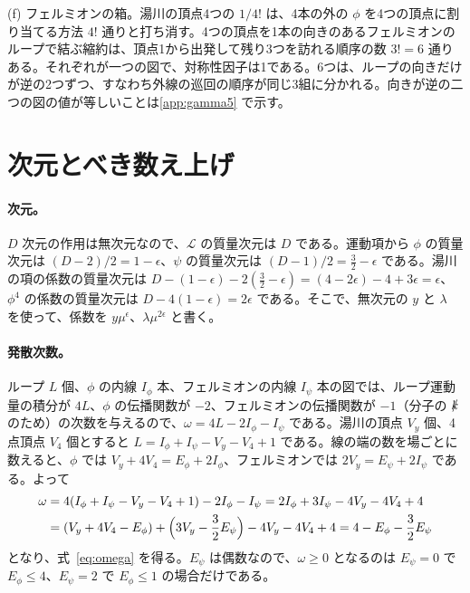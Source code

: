 \documentclass[a4paper,10pt]{ltjsarticle}
\begin{document}
(f) フェルミオンの箱。湯川の頂点4つの $1/4!$ は、4本の外の $\phi$ を4つの頂点に割り当てる方法 $4!$ 通りと打ち消す。4つの頂点を1本の向きのあるフェルミオンのループで結ぶ縮約は、頂点1から出発して残り3つを訪れる順序の数 $3!=6$ 通りある。それぞれが一つの図で、対称性因子は1である。6つは、ループの向きだけが逆の2つずつ、すなわち外線の巡回の順序が同じ3組に分かれる。向きが逆の二つの図の値が等しいことは\ref{app:gamma5} で示す。

\section{次元とべき数え上げ}\label{app:counting}

\paragraph{次元。}$D$ 次元の作用は無次元なので、$\mathcal{L}$ の質量次元は $D$ である。運動項から $\phi$ の質量次元は $(D-2)/2=1-\epsilon$、$\psi$ の質量次元は $(D-1)/2=\frac32-\epsilon$ である。湯川の項の係数の質量次元は $D-(1-\epsilon)-2(\frac32-\epsilon)=(4-2\epsilon)-4+3\epsilon=\epsilon$、$\phi^4$ の係数の質量次元は $D-4(1-\epsilon)=2\epsilon$ である。そこで、無次元の $y$ と $\lambda$ を使って、係数を $y\mu^\epsilon$、$\lambda\mu^{2\epsilon}$ と書く。

\paragraph{発散次数。}ループ $L$ 個、$\phi$ の内線 $I_\phi$ 本、フェルミオンの内線 $I_\psi$ 本の図では、ループ運動量の積分が $4L$、$\phi$ の伝播関数が $-2$、フェルミオンの伝播関数が $-1$（分子の $\slashed k$ のため）の次数を与えるので、$\omega=4L-2I_\phi-I_\psi$ である。湯川の頂点 $V_y$ 個、4点頂点 $V_4$ 個とすると $L=I_\phi+I_\psi-V_y-V_4+1$ である。線の端の数を場ごとに数えると、$\phi$ では $V_y+4V_4=E_\phi+2I_\phi$、フェルミオンでは $2V_y=E_\psi+2I_\psi$ である。よって
\begin{equation*}
\begin{aligned}
\omega&=4(I_\phi+I_\psi-V_y-V_4+1)-2I_\phi-I_\psi=2I_\phi+3I_\psi-4V_y-4V_4+4\\
&=(V_y+4V_4-E_\phi)+\Bigl(3V_y-\frac32E_\psi\Bigr)-4V_y-4V_4+4=4-E_\phi-\frac32E_\psi
\end{aligned}
\end{equation*}
となり、式~\eqref{eq:omega} を得る。$E_\psi$ は偶数なので、$\omega\ge0$ となるのは $E_\psi=0$ で $E_\phi\le4$、$E_\psi=2$ で $E_\phi\le1$ の場合だけである。
\end{document}
